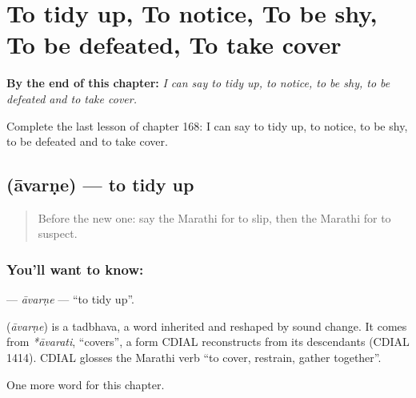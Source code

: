 
\chapter{To tidy up, To notice, To be shy, To be defeated, To take cover}
\label{ch:mr-to-tidy-up-to-notice-to-be-shy-to-be-defeated-to-take-cover}

\begin{chapteropening}
\textbf{By the end of this chapter:} \emph{I can say to tidy up, to notice, to be shy, to be defeated and to take cover.}

Complete the last lesson of chapter 168: I can say to tidy up, to notice, to be shy, to be defeated and to take cover.
\end{chapteropening}

\section[\texorpdfstring{\mr{आवरणे} (āvarṇe)}{आवरणे (āvarṇe)}]{ (āvarṇe) — to tidy up}

\label{lesson:MR-C168-avarne}



\begin{quote}
Before the new one: say the Marathi for to slip, then the Marathi for to suspect.
\end{quote}

\subsection*{You'll want to know: }
\textbf{} — \emph{āvarṇe} — \textquotedblleft{}to tidy up\textquotedblright{}.

\begin{cousinweb}
\textbf{} (\emph{āvarṇe}) is a tadbhava, a word inherited and reshaped by sound change. It comes from \emph{*āvarati}, \textquotedblleft{}covers\textquotedblright{}, a form CDIAL reconstructs from its descendants (CDIAL 1414). CDIAL glosses the Marathi verb \textquotedblleft{}to cover, restrain, gather together\textquotedblright{}.
\end{cousinweb}

\begin{grammarlens}[title={What you've built}]
One more word for this chapter.
\end{grammarlens}

